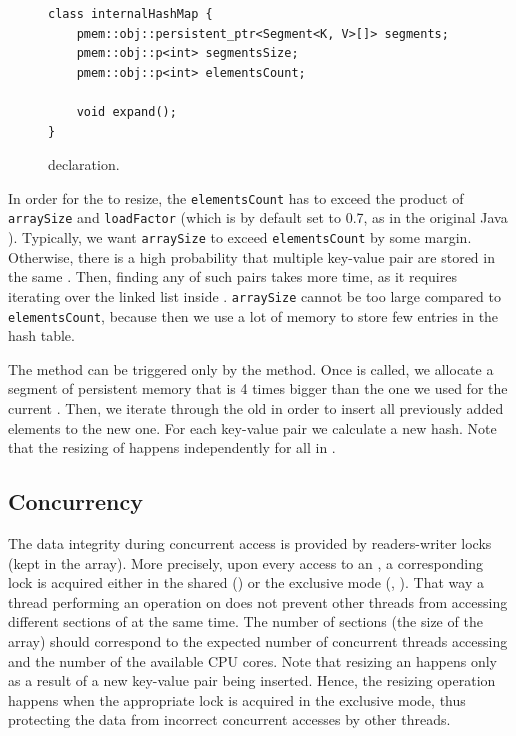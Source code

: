 \begin{figure}[ht]
\renewcommand{\figurename}{Listing}
\begin{lstlisting}
class internalHashMap {
    pmem::obj::persistent_ptr<Segment<K, V>[]> segments;
    pmem::obj::p<int> segmentsSize;
    pmem::obj::p<int> elementsCount;
    
    void expand();
}
\end{lstlisting}
\caption{\internalHashMap declaration.}
\label{internalHashMap}
\end{figure}

    In order for the \internalHashMap to resize, the \texttt{elementsCount} has to exceed the product of \texttt{arraySize} and \texttt{loadFactor} (which is by default set to 0.7, as in the original Java \HashMap \cite{HashMapJava}).
    Typically, we want \texttt{arraySize} to exceed \texttt{elementsCount} by some margin. Otherwise, there is a high probability that multiple key-value pair are stored in the same \Segment. Then, finding any of such pairs takes more time, as it requires iterating over the linked list inside \Segment. \texttt{arraySize} cannot be too large compared to \texttt{elementsCount}, because then we use a lot of memory to store few entries in the hash table.

    The \expandMethod method can be triggered only by the \insertMethod method. Once \expandMethod is called, we allocate a segment of persistent memory that is 4 times bigger than the one we used for the current \internalHashMap. Then, we iterate through the old \internalHashMap in order to insert all previously added elements to the new one. For each key-value pair we calculate a new hash. Note that the resizing of \internalHashMap happens independently for all \internalHashMap in \NvmHashMap.

\subsection{Concurrency} 
    
    The data integrity during concurrent access is provided by readers-writer locks (kept in the \locks array). More precisely, upon every access to an \internalHashMap, a corresponding lock is acquired either in the shared (\getMethod) or the exclusive mode (\insertMethod, \removeMethod). That way a thread performing an operation on \PHT does not prevent other threads from accessing different sections of \PHT at the same time. The number of sections (the size of the \internalHashMap array) should correspond to the expected number of concurrent threads accessing \PHT and the number of the available CPU cores. Note that resizing an \internalHashMap happens only as a result of a new key-value pair being inserted. Hence, the resizing operation happens when the appropriate lock is acquired in the exclusive mode, thus protecting the data from incorrect concurrent accesses by other threads.
            
